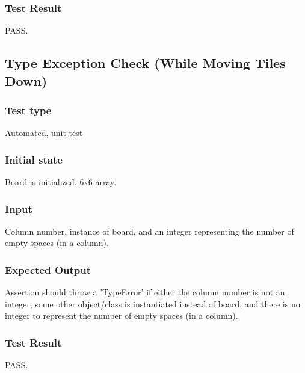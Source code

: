 \documentclass[12pt]{article}
\begin{document}
\subsubsection{Test Result}
PASS.

\newpage

\subsection{Type Exception Check (While Moving Tiles Down)}
\subsubsection{Test type}
Automated, unit test
\subsubsection{Initial state}
Board is initialized, 6x6 array.
\subsubsection{Input}
Column number, instance of board, and an integer representing the number of empty spaces (in a column). 
\subsubsection{Expected Output}
Assertion should throw a 'TypeError' if either the column number is not an integer, some other object/class is instantiated instead of board, and there is no integer to represent the number of empty spaces (in a column).
\subsubsection{Test Result}
PASS.
\end{document}
